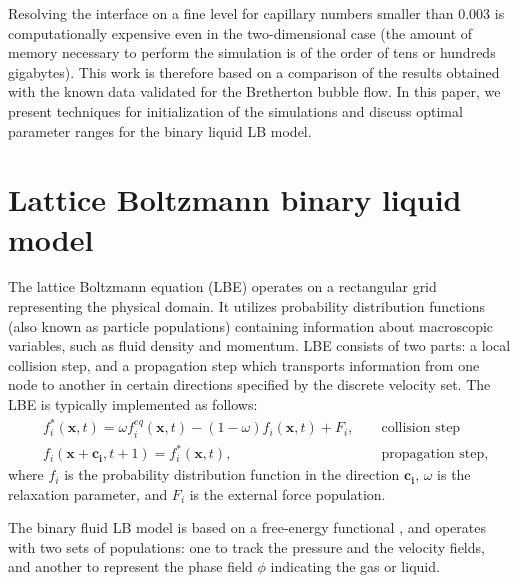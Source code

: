\documentclass[preprint,12pt]{elsarticle}
\begin{document}
Resolving the interface on a fine level for capillary numbers smaller than
$0.003$ is computationally expensive even in the two-dimensional case
(the amount of memory necessary to perform the simulation is of the order
of tens or hundreds gigabytes).  This work is therefore based on a
comparison of the results obtained with the known data
validated for the Bretherton bubble flow.  In this paper, we present
techniques for initialization of the simulations and discuss optimal
parameter ranges for the binary liquid LB model.

\section{Lattice Boltzmann binary liquid model}
The lattice Boltzmann equation (LBE) operates on a rectangular grid representing the
physical domain. It utilizes
probability distribution functions (also known as particle populations)
containing information about
macroscopic variables, such as fluid density and momentum. LBE consists of
two parts: a local collision step, and a propagation step which transports
information from one node to another in certain
directions specified by the discrete velocity set.
The LBE is typically implemented as follows:
\begin{equation}
\label{standard:implementation}
\begin{aligned}
&f_i^{*}(\bm{x},t)=\omega f_i^{eq}(\bm{x},t)-(1-\omega) f_i(\bm{x},t) +
F_i,&&\text{ collision step}\\
&f_i(\bm{x}+\bm{c_i},t+1)=f_i^{*}(\bm{x},t),&&\text{ propagation step}, 
\end{aligned}
\end{equation}
where $f_i$ is the probability distribution function in the direction $\bm{c_i}$, $\omega$ is the
relaxation parameter, and $F_i$ is the external force population. 

The binary fluid LB model is
based on a free-energy functional \cite{swift,landau}, and operates with two
sets of populations: one to track the pressure and the velocity fields, and another to represent the
phase field $\phi$ indicating the gas or liquid.
\end{document}

